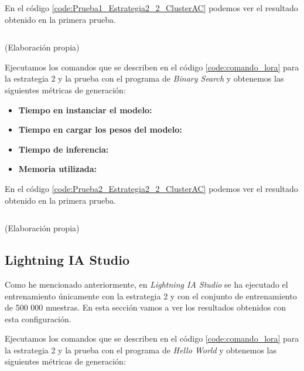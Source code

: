 En el código \ref{code:Prueba1_Estrategia2_2_ClusterAC} podemos ver el resultado obtenido
en la primera prueba.

\begin{mycode}
    \begin{verbatim}

    \end{verbatim}
    \caption[]{ (Elaboración propia)}
    \label{code:Prueba1_Estrategia2_2_ClusterAC}
\end{mycode}

Ejecutamos los comandos que se describen en el código \ref{code:comando_lora} para
la estrategia 2 y la prueba con el programa de \textit{Binary Search} y obtenemos
las siguientes métricas de generación:

\begin{itemize}
    \item \textbf{Tiempo en instanciar el modelo:}
    \item \textbf{Tiempo en cargar los pesos del modelo:}
    \item \textbf{Tiempo de inferencia:}
    \item \textbf{Memoria utilizada:}
\end{itemize}

En el código \ref{code:Prueba2_Estrategia2_2_ClusterAC} podemos ver el resultado obtenido
en la primera prueba.

\begin{mycode}
    \begin{verbatim}

    \end{verbatim}
    \caption[]{ (Elaboración propia)}
    \label{code:Prueba2_Estrategia2_2_ClusterAC}
\end{mycode}

\subsection{Lightning IA Studio}
\label{subsec:lightning_ia_studio}


Como he mencionado anteriormente, en \textit{Lightning IA Studio} se ha ejecutado el
entrenamiento únicamente con la estrategia 2 y con el conjunto de entrenamiento de
500 000 muestras. En esta sección vamos a ver los resultados obtenidos con esta
configuración.

Ejecutamos los comandos que se describen en el código \ref{code:comando_lora} para
la estrategia 2 y la prueba con el programa de \textit{Hello World} y obtenemos
las siguientes métricas de generación:

